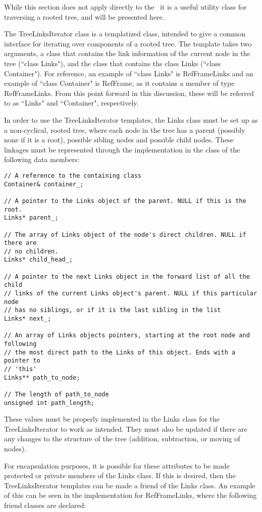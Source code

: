 While this section does not apply directly to the \, it is
a useful utility class for traversing a rooted tree, and will
be presented here.

The TreeLinksIterator class is a templatized class, intended to give a common
interface for iterating over components of a rooted tree. The template takes
two arguments, a class that contains the link information of the current
node in the tree (``class Links"), and the class that contains ths class Links
(``class Container"). For reference, an example of ``class Links" is RefFrameLinks
and an example of ``class Container" is RefFrame, as it contains a member
of type RefFrameLinks. From this point forward in this discussion, these
will be referred to as ``Links" and ``Container", respectively.

In order to use the TreeLinksIterator templates, the Links class
must be set up as a non-cyclical,
rooted tree, where each node in the tree has a parent
(possibly none if it is a root), possible sibling nodes and possible child
nodes. These linkages must be represented through the implementation in the
class of the following data members:

\begin{verbatim}
// A reference to the containing class
Container& container_;

// A pointer to the Links object of the parent. NULL if this is the root.
Links* parent_;

// The array of Links object of the node's direct children. NULL if there are
// no children.
Links* child_head_;

// A pointer to the next Links object in the forward list of all the child
// links of the current Links object's parent. NULL if this particular node
// has no siblings, or if it is the last sibling in the list
Links* next_;

// An array of Links objects pointers, starting at the root node and following
// the most direct path to the Links of this object. Ends with a pointer to
// 'this'
Links** path_to_node;

// The length of path_to_node
unsigned int path_length;
\end{verbatim}

These values must be properly implemented in the Links class for the
TreeLinksIterator to work as intended. They must also be updated if there
are any changes to the structure of the tree (addition, subtraction, or moving
of nodes).

For encapsulation purposes, it is possible for these attributes
to be made protected or private members of the Links class. If this is
desired, then the TreeLinksIterator templates can be made a friend
of the Links class. An example of this can be seen in the implementation
for RefFrameLinks, where the following friend classes are declared:

